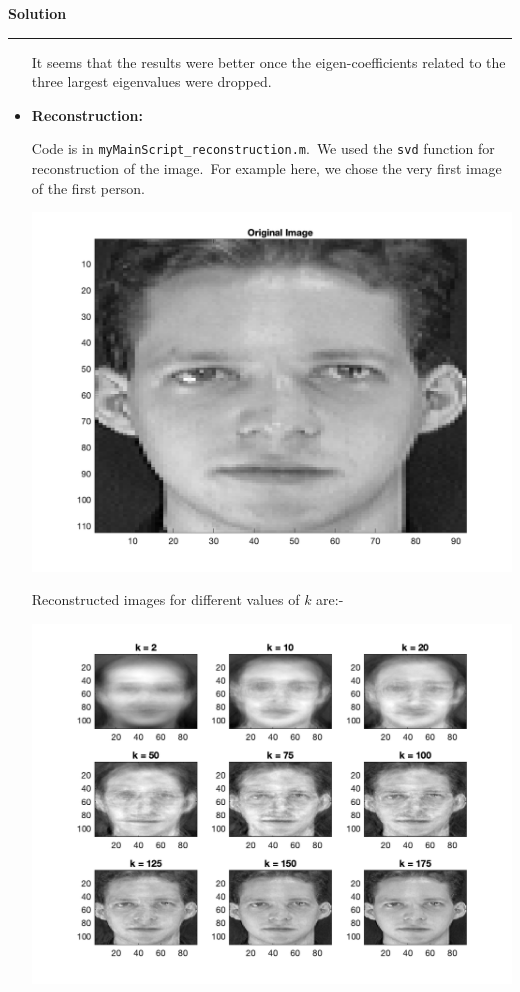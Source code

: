 \documentclass[a4paper,14pt]{article}
\newenvironment{solution}[2][]{%
    \begin{mdframed}[linecolor=blue!70!black, linewidth=2pt, roundcorner=10pt, backgroundcolor=yellow!10!white, skipabove=12pt, skipbelow=12pt]%
        \textbf{\large #2}
        \par\noindent\rule{\textwidth}{0.4pt}
}{
    \end{mdframed}
}
\begin{document}
\begin{solution}{Solution}
\begin{itemize}
		It seems that the results were better once the eigen-coefficients related to the three largest eigenvalues were dropped.

		\item \textbf{Reconstruction:}
		
		Code is in \texttt{myMainScript\_reconstruction.m}.\ We used the \texttt{svd} function for reconstruction of the image.\ For example here, we chose the very first image of the first person.

		\begin{center}
			\includegraphics[scale=0.21]{../images/original_image.png}
		\end{center}

		Reconstructed images for different values of $k$ are:-

		\begin{center}
			\includegraphics[width=0.9\linewidth]{../images/ORL_reconstructed_faces.png}
		\end{center}


\end{itemize}
\end{solution}
\end{document}
